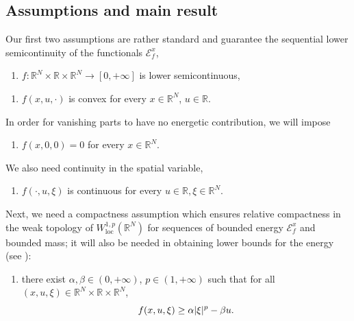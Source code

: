 \documentclass[JEP,XML,SOM,Unicode,published]{cedram}
\theoremstyle{plain}
\theoremstyle{definition}
\newcommand{\R}{\mathbb{R}}
\newcommand{\ener}{\mathcal{E}}
\newcommand{\loc}{\mathrm{loc}}
\DeclarePairedDelimiter{\abs}{\lvert}{\rvert}
\begin{document}
\subsection{Assumptions and main result}

Our first two assumptions are rather standard and guarantee the sequential lower semicontinuity of the functionals \(\ener_f^x\),

\begin{enumerate}[\textnormal{(H}$_1$\textnormal{)},leftmargin=1.5\normalparindent]
\item\label{hypLowerContinuous} \(f : \R^N\times\R\times\R^N \to [0,+\infty]\) is lower semicontinuous,
\end{enumerate}

\begin{enumerate}[\textnormal{(H}$_1$\textnormal{)},leftmargin=1.5\normalparindent,resume]
\item\label{hypConvex} $f(x,u,\cdot)$ is convex for every $x\in \R^N$, $u\in\R$.\end{enumerate}

In order for vanishing parts to have no energetic contribution, we will impose
\begin{enumerate}[\textnormal{(H}$_1$\textnormal{)},leftmargin=1.5\normalparindent,resume]
\item\label{hypZero} $f(x,0,0)=0$ for every $x\in \R^N$.
\end{enumerate}

We also need continuity in the spatial variable,
\begin{enumerate}[\textnormal{(H}$_1$\textnormal{)},leftmargin=1.5\normalparindent,resume]
\item\label{hypContinuous} $f(\cdot,u,\xi)$ is continuous for every $u\in\R,\xi\in \R^N$.
\end{enumerate}

Next, we need a compactness assumption which ensures relative compactness in the weak topology of \(W^{1,p}_\loc(\R^N)\) for sequences of bounded energy \(\ener_f^x\) and bounded mass; it will also be needed in obtaining lower bounds for the energy (see ):
\begin{enumerate}[\textnormal{(H}$_1$\textnormal{)},leftmargin=1.5\normalparindent,resume]
\item\label{hypCompact} there exist \(\alpha,\beta\!\in\!(0,+\infty)\), \(p\!\in\! (1,+\infty)\) such that for all $(x,u,\xi)\!\in\! \R^N \!\times\!\R\!\times\!\R^N$,
\[f(x,u,\xi) \geq \alpha\abs{\xi}^p-\beta u.\]
\end{enumerate}
\end{document}

